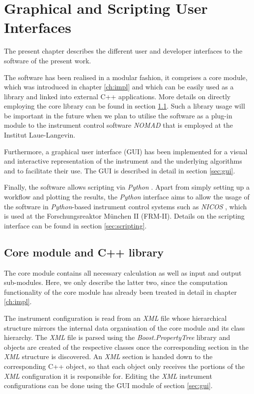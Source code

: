 %
%

\chapter{Graphical and Scripting User Interfaces}
\label{ch:gui}
The present chapter describes the different user and developer interfaces to the software of the present work.

The software has been realised in a modular fashion, it comprises a core
module, which was introduced in chapter \ref{ch:impl} and which can be easily used as a library 
and linked into external C++ applications. 
More details on directly employing the core library can be found in section \ref{sec:library}.
Such a library usage will be important in the future when we plan to utilise the software as a 
plug-in module to the instrument control software \textit{NOMAD} \cite{web_NOMAD} that is 
employed at the Institut Laue-Langevin.

Furthermore, a graphical user interface (GUI) has been implemented for a visual and interactive 
representation of the instrument and the underlying algorithms and to facilitate their use. 
The GUI is described in detail in section \ref{sec:gui}.

Finally, the software allows scripting via \textit{Python} \cite{Rossum2011, web_python}. 
Apart from simply setting up a workflow and plotting the results, the \textit{Python} interface 
aims to allow the usage of the software in \textit{Python}-based instrument control systems such as 
\textit{NICOS} \cite{web_NICOS}, which is used at the Forschungsreaktor M\"unchen II (FRM-II). 
Details on the scripting interface can be found in section \ref{sec:scripting}.



\section{Core module and C++ library}
\label{sec:library}
The core module contains all necessary calculation as well as input and output sub-modules. 
Here, we only describe the latter two, since the computation functionality of the core module 
has already been treated in detail in chapter \ref{ch:impl}.

The instrument configuration is read from an \textit{XML} file whose hierarchical structure
mirrors the internal data organisation of the core module and its class hierarchy.
The \textit{XML} file is parsed using the \textit{Boost.PropertyTree} library \cite{web_boost_proptree}
and objects are created of the respective classes once the corresponding section in the \textit{XML}
structure is discovered. An \textit{XML} section is handed down to the corresponding C++ object,
so that each object only receives the portions of the \textit{XML} configuration it is responsible for.
Editing the \textit{XML} instrument configurations can be done using the GUI module of section \ref{sec:gui}.

